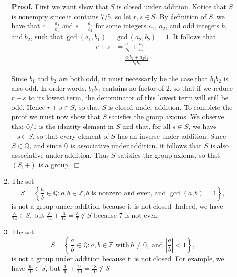 \documentclass[9pt]{article}
\newcommand{\qed}{\hfill \ensuremath{\Box}}
\newcommand{\Z}{\mathbb{Z}}
\newcommand{\Q}{\mathbb{Q}}
\begin{document}
\begin{enumerate}
\begin{enumerate}
               \textbf{Proof.} First we want show that $S$ is closed under 
               addition. Notice that $S$ is nonempty since it contains 7/5, so
               let $r, s \in S$. By definition of $S$, we have that
               $r = \frac{a_1}{b_1}$ and $s = \frac{a_2}{b_2}$ for some
               integers $a_1$, $a_2$, and odd integers $b_1$ and $b_2$, such
               that $\gcd(a_1, b_1) = \gcd(a_2, b_2) = 1$. It follows that
               \begin{align*}
                  r + s &= \frac{a_1}{b_1} + \frac{a_2}{b_2} \\
                        &= \frac{a_1b_2 + a_2b_1}{b_1b_2}.
               \end{align*}

               Since $b_1$ and $b_2$ are both odd, it must necessarily be the 
               case that $b_1b_2$ is also odd. In order words, $b_1b_2$ contains 
               no factor of 2, so that if we reduce $r + s$ to its lowest term, 
               the denominator of this lowest term will still be odd. Hence
               $r + s \in S$, so that $S$ is closed under addition. To complete 
               the proof we must now show that $S$ satisfies the group axioms. 
               We observe that $0/1$ is the identity element in $S$ and that, 
               for all $s \in S$, we have $-s \in S$, so that every 
               element of $S$ has an inverse under addition. Since
               $S \subset \Q$, and since $\Q$ is associative under addition, 
               it follows that $S$ is also associative under addition. Thus $S$ 
               satisfies the group axioms, so that $(S, +)$ is a group. \qed
         \item The set
               $$S = \left\{\frac{a}{b} \in \Q : a, b \in \Z, b
                        \text{ is nonzero and even,} \text{ and }
                        \gcd(a, b) = 1\right\},$$
               is not a group under addition because it is not closed. Indeed,
               we have $\frac{3}{14} \in S$, but
               $\frac{3}{14} + \frac{3}{14} = \frac{3}{7} \notin S$ because 7 is
               not even.
         \item The set
               $$S = \left\{\frac{a}{b} \in \Q : a, b \in \Z \text{ with }
                  b \neq 0, \text{ and }
                  \left|\frac{a}{b}\right| < 1\right\},$$
               is not a group under addition because it is not closed. For 
               example, we have $\frac{9}{10} \in S$, but
               $\frac{9}{10} + \frac{9}{10} = \frac{18}{10} \notin S$

\end{enumerate}
\end{enumerate}
\end{document}

